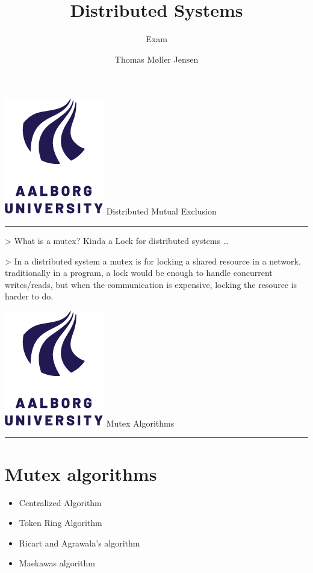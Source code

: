\documentclass[aspectratio=1610,17pt,utf8]{beamer}
\title[DS]{Distributed Systems}
\subtitle{Exam}
\author[Thomas Møller Jensen]{Thomas Møller Jensen}
\institute[Institute of Computer Science]
{
  Aalborg University\\
}
\newcommand{\mainframe}[1]{\color{blue} \includegraphics[width=.05\textwidth]{figures/aau.png} #1\\\color{black}\hrule}
\newcommand{\regularframe}[1]{\color{black}\includegraphics[width=.05\textwidth]{figures/aau.png} #1\\\hrule}
\begin{document}

\begin{frame}{\mainframe{Distributed Mutual Exclusion}}
    > What is a mutex? Kinda a Lock for distributed systems \ldots

    > In a distributed system a mutex is for locking a shared resource in a network, traditionally in a program, a lock would be enough to handle concurrent writes/reads, but when the communication is expensive, locking the resource is harder to do.
\end{frame}


\begin{frame}{\regularframe{Mutex Algorithms}}
    \section{Mutex algorithms}
    \begin{itemize}
        \item Centralized Algorithm
        \item Token Ring Algorithm
        \item Ricart and Agrawala's algorithm
        \item Maekawas algorithm
    \end{itemize}
\end{frame}

\end{document}
